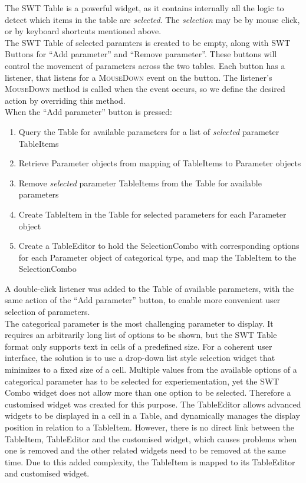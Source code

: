 The SWT Table is a powerful widget, as it contains internally all the logic to detect which items in the table are \textit{selected}. The \textit{selection} may be by mouse click, or by keyboard shortcuts mentioned above.\\
The SWT Table of selected paramters is created to be empty, along with SWT Buttons for ``Add parameter'' and ``Remove parameter''. These buttons will control the movement of parameters across the two tables. Each button has a listener, that listens for a \textsc{MouseDown} event on the button. The listener's \textsc{MouseDown} method is called when the event occurs, so we define the desired action by overriding this method.\\
When the ``Add parameter'' button is pressed:
\begin{enumerate}
\item Query the Table for available parameters for a list of \textit{selected} parameter TableItems
\item Retrieve Parameter objects from mapping of TableItems to Parameter objects
\item Remove \textit{selected} parameter TableItems from the Table for available parameters
\item Create TableItem in the Table for selected parameters for each Parameter object
\item Create a TableEditor to hold the SelectionCombo \cite{mcsc} with corresponding options for each Parameter object of categorical type, and map the TableItem to the SelectionCombo
\end{enumerate}
A double-click listener was added to the Table of available parameters, with the same action of the ``Add parameter'' button, to enable more convenient user selection of parameters.\\
The categorical parameter is the most challenging parameter to display. It requires an arbitrarily long list of options to be shown, but the SWT Table format only supports text in cells of a predefined size. For a coherent user interface, the solution is to use a drop-down list style selection widget that minimizes to a fixed size of a cell. Multiple values from the available options of a categorical parameter has to be selected for experiementation, yet the SWT Combo widget does not allow more than one option to be selected. Therefore a customised widget was created for this purpose. The TableEditor \cite{swtwidgets} allows advanced widgets to be displayed in a cell in a Table, and dynamically manages the display position in relation to a TableItem. However, there is no direct link between the TableItem, TableEditor and the customised widget, which causes problems when one is removed and the other related widgets need to be removed at the same time. Due to this added complexity, the TableItem is mapped to its TableEditor and customised widget.\\
